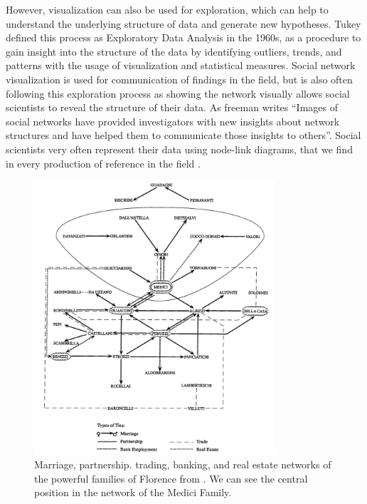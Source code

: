 However, visualization can also be used for exploration, which can help to understand the underlying structure of data and generate new hypotheses.
Tukey defined this process as Exploratory Data Analysis in the 1960s\cite{tukeyExploratoryDataAnalysis1977}, as a procedure to gain insight into the structure of the data by identifying outliers, trends, and patterns with the usage of visualization and statistical measures.
Social network visualization is used for communication of findings in the field, but is also often following this exploration process as showing the network visually allows social scientists to reveal the structure of their data.
As freeman writes ``Images of social networks have provided investigators with new insights about network structures and have helped them to communicate those insights to others''\cite{freemanVisualizingSocialNetworks2000}.
Social scientists very often represent their data using node-link diagrams, that we find in every production of reference in the field \cite{wassermanSocialNetworkAnalysis1994, tabassumSocialNetworkAnalysis2018, lazegaReseaux}.

\begin{figure}[!ht]
    \centering %
    \includegraphics[width=0.8\textwidth]{static/figures/RelatedWork/padgett-Medicis.png}
    \caption{Marriage, partnership. trading, banking, and real estate networks of the powerful families of Florence from \cite{padgettRobustActionRise1993}. We can see the central position in the network of the Medici Family.}
    \label{fig:padgett-medicis}
\end{figure}

